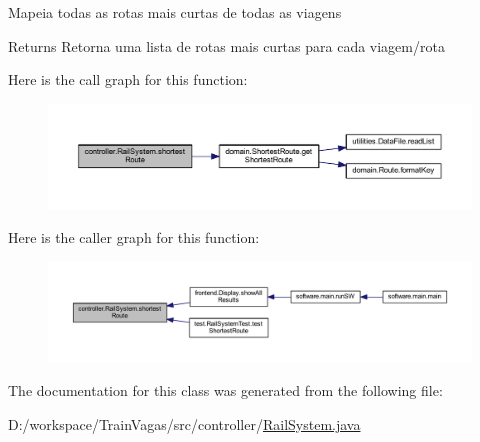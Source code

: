 Mapeia todas as rotas mais curtas de todas as viagens

\begin{DoxyReturn}{Returns}
Retorna uma lista de rotas mais curtas para cada viagem/rota 
\end{DoxyReturn}
Here is the call graph for this function\+:\nopagebreak
\begin{figure}[H]
\begin{center}
\leavevmode
\includegraphics[width=350pt]{classcontroller_1_1_rail_system_a4eccf86f1b3525490c6d44b0522d746b_cgraph}
\end{center}
\end{figure}
Here is the caller graph for this function\+:\nopagebreak
\begin{figure}[H]
\begin{center}
\leavevmode
\includegraphics[width=350pt]{classcontroller_1_1_rail_system_a4eccf86f1b3525490c6d44b0522d746b_icgraph}
\end{center}
\end{figure}


The documentation for this class was generated from the following file\+:\begin{DoxyCompactItemize}
\item 
D\+:/workspace/\+Train\+Vagas/src/controller/\hyperlink{_rail_system_8java}{Rail\+System.\+java}\end{DoxyCompactItemize}
